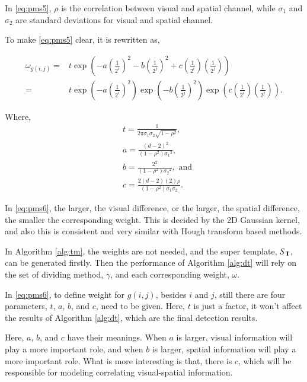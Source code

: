 \documentclass[paper]{ieice}
\begin{document}
In \ref{eq:pms5}, $\rho$ is the correlation between visual and spatial channel, while $\sigma_1$ and $\sigma_2$ are standard deviations for visual and spatial channel.

To make \ref{eq:pms5} clear, it is rewritten as,

\begin{equation}
\label{eq:pms6}
\begin{aligned}
\omega_{g(i,j)}=& t \exp(-a (\frac 1 {2^i})^2 - b (\frac 1 {2^j})^2 + c (\frac 1 {2^i}) (\frac 1 {2^j}))\\
                =& t \exp(-a (\frac 1 {2^i})^2) \exp(- b (\frac 1 {2^j})^2 )\exp ( c (\frac 1 {2^i}) (\frac 1 {2^j})).
\end{aligned}
\end{equation}

Where,
\[\begin{aligned}
&t= \frac 1 {2 \pi \sigma_1 \sigma_2 \sqrt{1-\rho^2} } , \\
&a= \frac {(d-2)^2  }{(1-\rho^2){\sigma_1}^2},\\
&b= \frac{2^2 }{(1-\rho^2){\sigma_2}^2 },\mbox{ and}\\
&c= \frac{2 (d-2) (2)  \rho  }{(1-\rho^2){\sigma_1}{\sigma_2} }.
\end{aligned}
\]

In \ref{eq:pms6}, the larger, the visual difference, or the larger, the spatial difference, the smaller the corresponding weight. This is decided by the 2D Gaussian kernel, and also this is consistent and very similar with Hough transform based methods.

In Algorithm \ref{alg:tm}, the weights are not needed, and the super template, $S_{\bf T}$, can be generated firstly. Then the performance of Algorithm \ref{alg:dt} will rely on the set of dividing method, $\gamma$, and each corresponding weight, $\omega$.


In \ref{eq:pms6}, to define weight for $g(i,j)$, besides $i$ and $j$, still there are four parameters, $t$, $a$, $b$, and $c$, need to be given. Here, $t$ is just a factor, it won't affect the results of Algorithm \ref{alg:dt}, which are the final detection results.

Here, $a$, $b$, and $c$ have their meanings. When $a$ is larger, visual information will play a more important role, and when $b$ is larger, spatial information will play a more important role. What is more interesting is that, there is $c$, which will be responsible for modeling correlating visual-spatial information.
\end{document}
